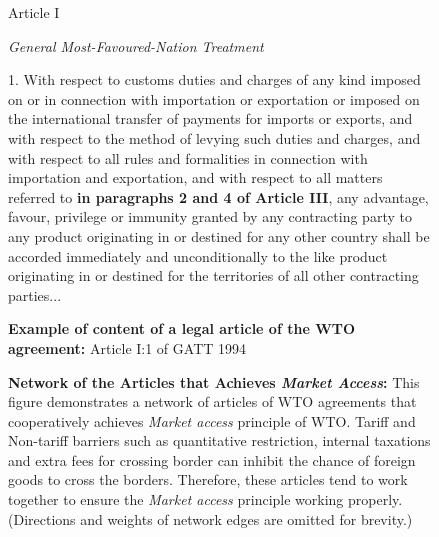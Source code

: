 \begin{figure}
    \begin{tightcenter}
    Article I
    \end{tightcenter}
    \begin{tightcenter}
    \textit{General Most-Favoured-Nation Treatment}
    \end{tightcenter}
    1. With respect to customs duties and charges of any kind imposed on or in connection
    with importation or exportation or imposed on the international transfer of payments for
    imports or exports, and with respect to the method of levying such duties and charges, and
    with respect to all rules and formalities in connection with importation and exportation, and
    with respect to all matters referred to \textbf{in paragraphs 2 and 4 of Article III}, any advantage,
    favour, privilege or immunity granted by any contracting party to any product originating in
    or destined for any other country shall be accorded immediately and unconditionally to the
    like product originating in or destined for the territories of all other contracting parties...
    \caption{\textbf{Example of content of a legal article of the WTO agreement:} Article I:1 of GATT 1994}
    \label{fig:gatt_art1}
    \end{figure}

\begin{figure}
    \centering{
        
    }
    \caption{{\bf Network of the Articles that Achieves \textit{Market Access}:}
        This figure demonstrates a network of articles of WTO agreements
        that cooperatively achieves \textit{Market access} principle of WTO.
        Tariff and Non-tariff barriers such as quantitative restriction, internal taxations
        and extra fees for crossing border can inhibit the chance of foreign goods to cross the borders.
        Therefore, these articles tend to work together to ensure the \textit{Market access} principle working properly.
        (Directions and weights of network edges are omitted for brevity.)
    }
    \label{fig:market-aceess_directed}
\end{figure}









